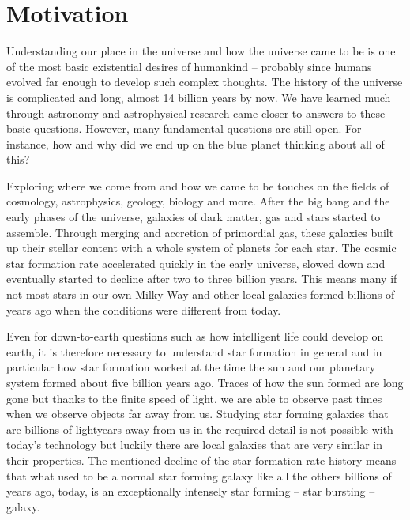 
\chapter{Motivation}
\label{part: motivation}



Understanding our place in the universe and how the universe came to be is one of the most basic existential desires of humankind -- probably since humans evolved far enough to develop such complex thoughts. The history of the universe is complicated and long, almost 14 billion years by now. We have learned much through astronomy and astrophysical research came closer to answers to these basic questions. However, many fundamental questions are still open. For instance, how and why did we end up on the blue planet thinking about all of this?
\vspace{0.25\baselineskip}

Exploring where we come from and how we came to be touches on the fields of cosmology, astrophysics, geology, biology and more. After the big bang and the early phases of the universe, galaxies of dark matter, gas and stars started to assemble. Through merging and accretion of primordial gas, these galaxies built up their stellar content with a whole system of planets for each star. The cosmic star formation rate accelerated quickly in the early universe, slowed down and eventually started to decline after two to three billion years. This means many if not most stars in our own Milky Way and other local galaxies formed billions of years ago when the conditions were different from today.

Even for down-to-earth questions such as how intelligent life could develop on earth, it is therefore necessary to understand star formation in general and in particular how star formation worked at the time the sun and our planetary system formed about five billion years ago. Traces of how the sun formed are long gone but thanks to the finite speed of light, we are able to observe past times when we observe objects far away from us.
Studying star forming galaxies that are billions of lightyears away from us in the required detail is not possible with today's technology but luckily there are local galaxies that are very similar in their properties. The mentioned decline of the star formation rate history means that what used to be a normal star forming galaxy like all the others billions of years ago, today, is an exceptionally intensely star forming -- star bursting -- galaxy.

